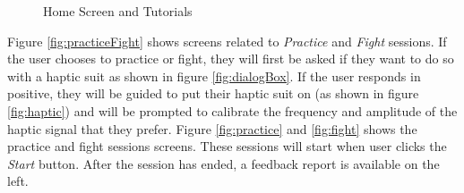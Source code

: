 \begin{figure}[ht]
{  }
  \quad 
  \caption{Home Screen and Tutorials} 
  \centering
  \label{fig:homeTut}
\end{figure}
\clearpage
Figure \ref{fig:practiceFight} shows screens related to \textit{Practice} and \textit{Fight} sessions. If the user chooses to practice or fight, they will first be asked if they want to do so with a haptic suit as shown in figure \ref{fig:dialogBox}. If the user responds in positive, they will be guided to put their haptic suit on (as shown in figure \ref{fig:haptic}) and will be prompted to calibrate the frequency and amplitude of the haptic signal that they prefer. Figure \ref{fig:practice} and \ref{fig:fight} shows the practice and fight sessions screens. These sessions will start when user clicks the \textit{Start} button. After the session has ended, a feedback report is available on the left.
